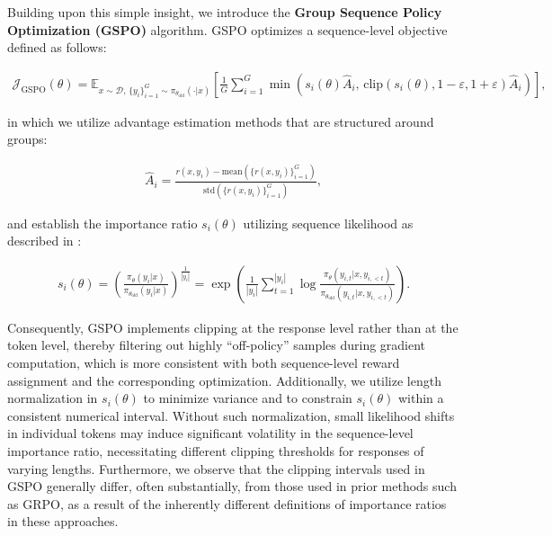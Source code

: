 Building upon this simple insight, we introduce the \textbf{Group Sequence Policy Optimization (GSPO)} algorithm. GSPO optimizes a sequence-level objective defined as follows:

\begin{align}
\mathcal{J}_\text{GSPO} (\theta) =
\mathbb{E}_{ x \sim \mathcal{D},\, \{y_i\}_{i=1}^G \sim \pi_{\theta_\text{old}}( \cdot | x) }
\left[ 
\frac{1}{G} \sum_{i=1}^{G}
\min \left( s_{i}(\theta)  \widehat{A}_{i},  \, \mathrm{clip} \left( s_{i}(\theta), 1 - {\varepsilon}, 1 + {\varepsilon} \right) \widehat{A}_{i} \right) 
\right],
\label{equ:gspo}
\end{align}

in which we utilize advantage estimation methods that are structured around groups:

\begin{align}
\widehat{A}_{i} = \frac{r(x, y_i) - \mathrm{mean} \left( \{ r(x, y_i) \}_{i=1}^G \right) }{ \mathrm{std} \left( \{ r(x, y_i) \}_{i=1}^G \right) },
\end{align}

and establish the importance ratio $s_{i}(\theta)$ utilizing sequence likelihood as described in \citet{click}:

\begin{align}
s_{i}(\theta) = \left( \frac{ \pi_{\theta} (y_i | x) }{ \pi_{\theta_\text{old}} (y_i | x)} \right)^{\frac{1}{|y_i|}}
=
\exp \left( \frac{1}{|y_i|} \sum_{t=1}^{|y_i|} \log \frac{ \pi_{\theta} (y_{i,t} | x, y_{i,<t}) }{ \pi_{\theta_\text{old}} (y_{i,t} | x,y_{i,<t})} \right).
\end{align}

Consequently, GSPO implements clipping at the response level rather than at the token level, thereby filtering out highly ``off-policy'' samples during gradient computation, which is more consistent with both sequence-level reward assignment and the corresponding optimization. Additionally, we utilize length normalization in $s_{i}(\theta)$ to minimize variance and to constrain $s_{i}(\theta)$ within a consistent numerical interval. Without such normalization, small likelihood shifts in individual tokens may induce significant volatility in the sequence-level importance ratio, necessitating different clipping thresholds for responses of varying lengths. Furthermore, we observe that the clipping intervals used in GSPO generally differ, often substantially, from those used in prior methods such as GRPO, as a result of the inherently different definitions of importance ratios in these approaches.

